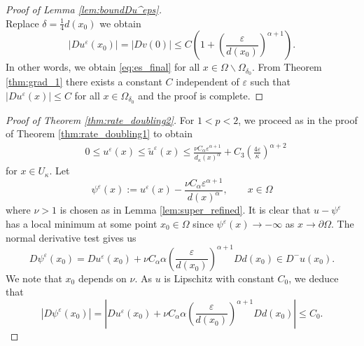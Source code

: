 \documentclass[12pt,reqno]{amsart}
\numberwithin{figure}{section}
\theoremstyle{plain}
\theoremstyle{remark}
\numberwithin{equation}{section}
\begin{document}
\begin{proof}[Proof of Lemma \ref{lem:boundDu^eps}]
\begin{equation*}
\end{equation*}
Replace $\delta = \frac{1}{4}d(x_0)$ we obtain
\begin{equation*}
    |Du^\varepsilon(x_0)| = |Dv(0)| \leq C\left(1+ \left(\frac{\varepsilon}{d(x_0)}\right)^{\alpha+1}\right).
\end{equation*}
In other words, we obtain \eqref{eq:es_final} for all $x\in \Omega\backslash\Omega_{\delta_0}$. From Theorem \ref{thm:grad_1} there exists a constant $C$ independent of $\varepsilon$ such that $|Du^\varepsilon(x)|\leq C$ for all $x\in \Omega_{\delta_0}$ and the proof is complete.
\end{proof}



\begin{proof}[Proof of Theorem \ref{thm:rate_doubling2}] For $1<p<2$, we proceed as in the proof of Theorem \ref{thm:rate_doubling1} to obtain 
\begin{align}
    &0\leq u^\varepsilon(x) \leq \tilde{u}^\varepsilon(x)  \leq \frac{\nu C_\alpha\varepsilon^{\alpha+1}}{d_\kappa(x)^{\alpha}} + C_3\left(\frac{4\varepsilon}{\kappa}\right)^{\alpha+2} \label{annulus2a}
\end{align}
for $x\in U_\kappa$. Let
\begin{equation*}
    \psi^\varepsilon(x) := u^\varepsilon(x) - \frac{\nu C_\alpha \varepsilon^{\alpha+1}}{d(x)^\alpha}, \qquad x\in \Omega
\end{equation*}
where $\nu > 1$ is chosen as in Lemma \ref{lem:super_refined}. It is clear that $u-\psi^\varepsilon$ has a local minimum at some point $x_0\in \Omega$ since $\psi^\varepsilon(x)\to -\infty$ as $x\to \partial\Omega$. The normal derivative test gives us 
\begin{equation*}
    D\psi^\varepsilon(x_0) = Du^\varepsilon(x_0) + \nu C_\alpha\alpha \left(\frac{\varepsilon}{d(x_0)}\right)^{\alpha+1} D d(x_0) \in D^-u(x_0).
\end{equation*}
We note that $x_0$ depends on $\nu$. 
As $u$ is Lipschitz with constant $C_0$, we deduce that
\begin{equation*}
    |D\psi^\varepsilon(x_0)| = \left|Du^\varepsilon(x_0) + \nu C_\alpha\alpha \left(\frac{\varepsilon}{d(x_0)}\right)^{\alpha+1} D d(x_0) \right| \leq C_0.

\end{equation*}
\end{proof}
\end{document}
